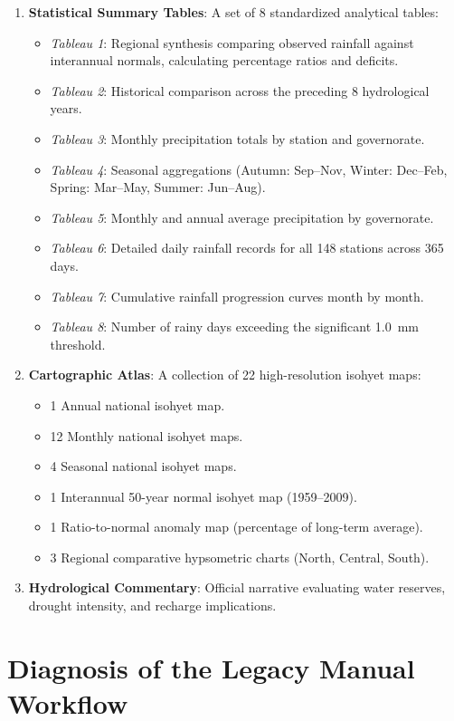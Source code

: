 \documentclass[12pt,a4paper]{report}
\begin{document}
\begin{enumerate}
  \item \textbf{Statistical Summary Tables}: A set of 8 standardized analytical tables:
  \begin{itemize}
    \item \textit{Tableau 1}: Regional synthesis comparing observed rainfall against interannual normals, calculating percentage ratios and deficits.
    \item \textit{Tableau 2}: Historical comparison across the preceding 8 hydrological years.
    \item \textit{Tableau 3}: Monthly precipitation totals by station and governorate.
    \item \textit{Tableau 4}: Seasonal aggregations (Autumn: Sep--Nov, Winter: Dec--Feb, Spring: Mar--May, Summer: Jun--Aug).
    \item \textit{Tableau 5}: Monthly and annual average precipitation by governorate.
    \item \textit{Tableau 6}: Detailed daily rainfall records for all 148 stations across 365 days.
    \item \textit{Tableau 7}: Cumulative rainfall progression curves month by month.
    \item \textit{Tableau 8}: Number of rainy days exceeding the significant 1.0~mm threshold.
  \end{itemize}
  \item \textbf{Cartographic Atlas}: A collection of 22 high-resolution isohyet maps:
  \begin{itemize}
    \item 1 Annual national isohyet map.
    \item 12 Monthly national isohyet maps.
    \item 4 Seasonal national isohyet maps.
    \item 1 Interannual 50-year normal isohyet map (1959--2009).
    \item 1 Ratio-to-normal anomaly map (percentage of long-term average).
    \item 3 Regional comparative hypsometric charts (North, Central, South).
  \end{itemize}
  \item \textbf{Hydrological Commentary}: Official narrative evaluating water reserves, drought intensity, and recharge implications.
\end{enumerate}

\section{Diagnosis of the Legacy Manual Workflow}
\end{document}
